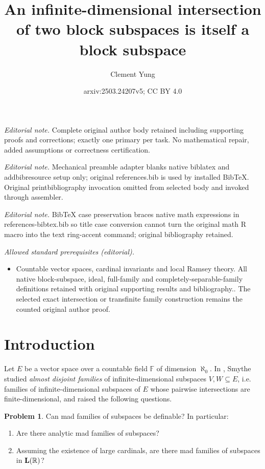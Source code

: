 \documentclass[10pt,a4paper]{amsart}
\title{An infinite-dimensional intersection of two block subspaces is itself a block subspace}
\author{Clement Yung}
\date{arxiv:2503.24207v5; CC BY 4.0}
\theoremstyle{plain}
\numberwithin{equation}{section}
\theoremstyle{definition}
\newtheorem{prob}[theorem]{Problem}
\newcommand{\R}{\mathbb{R}}
\let\strokeL\L
\DeclareRobustCommand{\L}{\ifmmode\mathbf{L}\else\strokeL\fi}
\begin{document}
\maketitle
\noindent\textit{Editorial note.} Complete original author body retained including supporting proofs and corrections; exactly one primary per task. No mathematical repair, added assumptions or correctness certification.\par\medskip
\noindent\textit{Editorial note.} Mechanical preamble adapter blanks native biblatex and addbibresource setup only; original references.bib is used by installed BibTeX. Original printbibliography invocation omitted from selected body and invoked through assembler.\par\medskip
\noindent\textit{Editorial note.} BibTeX case preservation braces native math expressions in references-bibtex.bib so title case conversion cannot turn the original math R macro into the text ring-accent command; original bibliography retained.\par\medskip
\noindent\textit{Allowed standard prerequisites (editorial).}\begin{itemize}
\item Countable vector spaces, cardinal invariants and local Ramsey theory. All native block-subspace, ideal, full-family and completely-separable-family definitions retained with original supporting results and bibliography.. The selected exact intersection or transfinite family construction remains the counted original author proof.
\end{itemize}\medskip
\section{Introduction}
\label{sec:intro}


Let $E$ be a vector space over a countable field $\mathbb{F}$ of dimension $\aleph_0$. In \cite{S19}, Smythe studied \emph{almost disjoint families} of infinite-dimensional subspaces $V,W \subseteq E$, i.e. families of infinite-dimensional subspaces of $E$ whose pairwise intersections are finite-dimensional, and raised the following questions.
\begin{prob}
\label{prob:definable.mad.families}
    Can mad families of subspaces be definable? In particular:
    \begin{enumerate}
        \item Are there analytic mad families of subspaces?
        
        \item Assuming the existence of large cardinals, are there mad families of subspaces in $\L(\R)$?
    \end{enumerate}
\end{prob}
\end{document}
